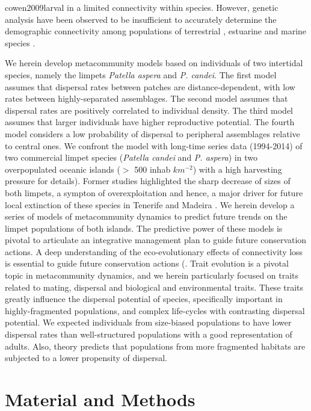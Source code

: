 \documentclass[12pt]{article}
\begin{document}
\begin{justify}
{{{{{{cowen2009larval} in a limited connectivity within species. However, genetic analysis have been observed to be insufficient to accurately determine the demographic connectivity among populations of terrestrial \citep{chapuis2011challenges}, estuarine \citep{turner2002genetic} and marine species \citep{hawkins2016fisheries}.

We herein develop metacommunity models based on individuals of two intertidal species, namely the limpets \textit{Patella aspera} and \textit{P. candei}. The first model assumes that dispersal rates between patches are distance-dependent, with low rates between highly-separated assemblages. The second model assumes that dispersal rates are positively correlated to individual density. The third model assumes that larger individuals have higher reproductive potential. The fourth model considers a low probability of dispersal to peripheral assemblages relative to central ones. We confront the model with long-time series data (1994-2014) of two commercial limpet species (\textit{Patella candei} and \textit{P. aspera}) in two overpopulated oceanic islands ($>$ 500 inhab $km^{-2}$) with a high harvesting pressure \citep{riera2016clear, sousa2019long} for details). Former studies highlighted the sharp decrease of sizes of both limpets, a sympton of overexploitation and hence, a major driver for future local extinction of these species in Tenerife \citep{riera2016clear} and Madeira \citep{sousa2019long}. We herein develop a series of models  of metacommunity dynamics to predict future trends on the limpet populations of both islands. The predictive power of these models is pivotal to articulate an integrative management plan to guide future conservation actions. A deep understanding of the eco-evolutionary effects of connectivity loss is essential to guide future conservation actions (\citep{travis2013dispersal, urban2001landscape}. Trait evolution is a pivotal topic in metacommunity dynamics, and we herein particularly focused on traits related to mating, dispersal and biological and environmental traits. These traits greatly influence the dispersal potential of species, specifically important in highly-fragmented populations, and complex life-cycles with contrasting dispersal potential.
We expected individuals from size-biased populations to have lower dispersal rates than well-structured populations with a good representation of adults. Also, theory predicts that populations from more fragmented habitats are subjected to a lower propensity of dispersal.

\section{Material and Methods}
}}}}}
\end{justify}
\end{document}
